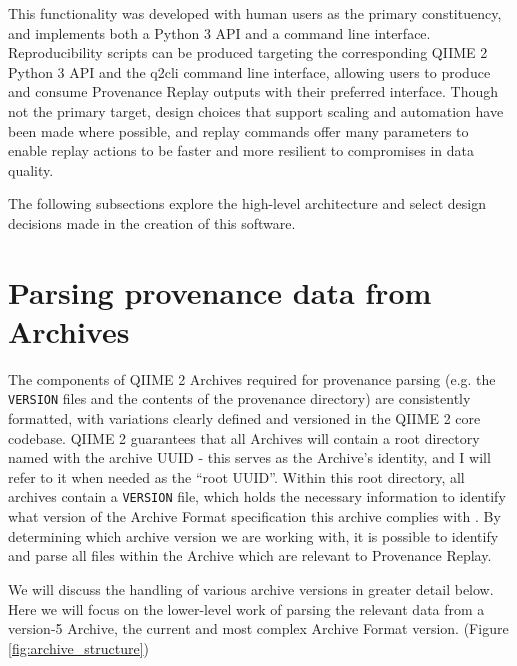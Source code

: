 This functionality was developed with human users as the primary constituency,
and implements both a Python 3 API and a command line interface. Reproducibility
scripts can be produced targeting the corresponding QIIME 2 Python 3 API and the
q2cli command line interface, allowing users to produce and consume Provenance
Replay outputs with their preferred interface. Though not the primary target,
design choices that support scaling and automation have been made where
possible, and replay commands offer many parameters to enable replay actions to
be faster and more resilient to compromises in data quality.

The following subsections explore the high-level architecture and select design
decisions made in the creation of this software.

\section{Parsing provenance data from Archives}

The components of QIIME 2 Archives required for provenance parsing (e.g. the
\texttt{VERSION} files and the contents of the provenance directory) are consistently
formatted, with variations clearly defined and versioned in the QIIME 2 core
codebase. QIIME 2 guarantees that all Archives will contain a root directory
named with the archive UUID - this serves as the Archive’s identity, and I will
refer to it when needed as the “root UUID”. Within this root directory, all
archives contain a \texttt{VERSION} file, which holds the necessary information to
identify what version of the Archive Format specification this archive complies
with \parencite{qiime_2_development_team_anatomy_2018}. By determining which
archive version we are working with, it is possible to identify and parse all
files within the Archive which are relevant to Provenance Replay.

We will discuss the handling of various archive versions in greater detail
below. Here we will focus on the lower-level work of parsing the relevant data
from a version-5 Archive, the current and most complex Archive Format version.
(Figure \ref{fig:archive_structure})

